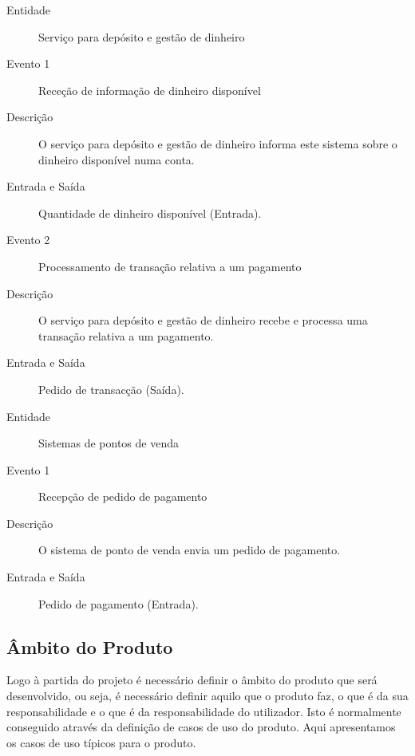 \documentclass[12pt,a4paper]{article}
\begin{document}
      \begin{description}
        \item[Entidade]Serviço para depósito e gestão de dinheiro
        \item[Evento 1]Receção de informação de dinheiro disponível
        \item[Descrição]O serviço para depósito e gestão de dinheiro informa este sistema sobre o dinheiro disponível numa conta.
        \item[Entrada e Saída]Quantidade de dinheiro disponível (Entrada).

        \item[Evento 2]Processamento de transação relativa a um pagamento
        \item[Descrição]O serviço para depósito e gestão de dinheiro recebe e processa uma transação relativa a um pagamento.
        \item[Entrada e Saída]Pedido de transacção (Saída).
      \end{description}  
      \vspace{0.5cm}

      \begin{description}
        \item[Entidade]Sistemas de pontos de venda

        \item[Evento 1]Recepção de pedido de pagamento
        \item[Descrição]O sistema de ponto de venda envia um pedido de pagamento.
        \item[Entrada e Saída]Pedido de pagamento (Entrada).
      \end{description}

  \subsection{Âmbito do Produto}

    Logo à partida do projeto é necessário definir o âmbito do produto que será desenvolvido, ou seja, é necessário definir aquilo que o produto faz, o que é da sua responsabilidade e o que é da responsabilidade do utilizador. Isto é normalmente conseguido através da definição de casos de uso do produto. Aqui apresentamos os casos de uso típicos para o produto.
\end{document}
